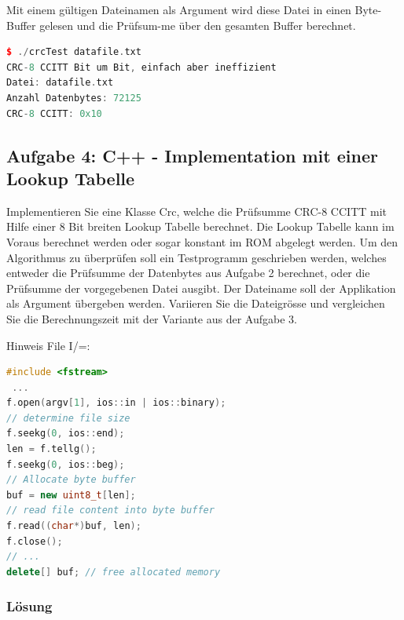 Mit einem gültigen Dateinamen als Argument wird diese Datei in einen Byte-Buffer gelesen und die Prüfsum-me über den gesamten Buffer berechnet.

\begin{lstlisting}[language=C++, style=C++]
$ ./crcTest datafile.txt
CRC-8 CCITT Bit um Bit, einfach aber ineffizient
Datei: datafile.txt
Anzahl Datenbytes: 72125
CRC-8 CCITT: 0x10
\end{lstlisting}


\noindent\makebox[\linewidth]{\rule{\paperwidth}{0.4pt}}

\noindent\makebox[\linewidth]{\rule{\paperwidth}{0.4pt}}


\subsection{Aufgabe 4: C++ - Implementation mit einer Lookup Tabelle}
Implementieren Sie eine Klasse Crc, welche die Prüfsumme CRC-8 CCITT mit Hilfe einer 8 Bit breiten Lookup
Tabelle berechnet. Die Lookup Tabelle kann im Voraus berechnet werden oder sogar konstant im ROM
abgelegt werden.
Um den Algorithmus zu überprüfen soll ein Testprogramm geschrieben werden, welches entweder die Prüfsumme
der Datenbytes aus Aufgabe 2 berechnet, oder die Prüfsumme der vorgegebenen Datei ausgibt. Der
Dateiname soll der Applikation als Argument übergeben werden. Variieren Sie die Dateigrösse und vergleichen
Sie die Berechnungszeit mit der Variante aus der Aufgabe 3.

\medskip

Hinweis File I/=:

\begin{lstlisting}[language=C++, style=C++]
#include <fstream>
 ...
f.open(argv[1], ios::in | ios::binary);
// determine file size
f.seekg(0, ios::end);
len = f.tellg();
f.seekg(0, ios::beg);
// Allocate byte buffer
buf = new uint8_t[len];
// read file content into byte buffer
f.read((char*)buf, len);
f.close();
// ...
delete[] buf; // free allocated memory
\end{lstlisting}

\subsubsection{Lösung}


